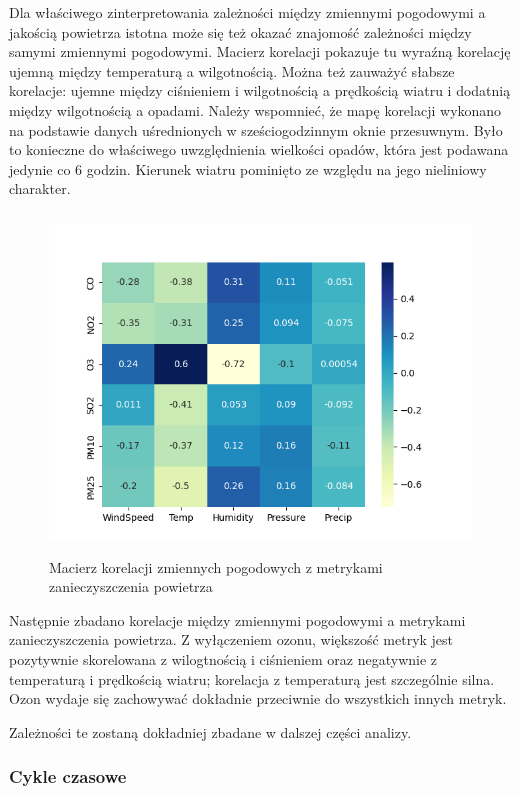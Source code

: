 \documentclass[18pt, letterpaper]{article}
\begin{document}
Dla właściwego zinterpretowania zależności między zmiennymi pogodowymi a jakością powietrza istotna może się też okazać znajomość zależności między samymi zmiennymi pogodowymi. Macierz korelacji pokazuje tu wyraźną korelację ujemną między temperaturą a wilgotnością. Można też zauważyć słabsze korelacje: ujemne między ciśnieniem i wilgotnością a prędkością wiatru i dodatnią między wilgotnością a opadami. Należy wspomnieć, że mapę korelacji wykonano na podstawie danych uśrednionych w sześciogodzinnym oknie przesuwnym. Było to konieczne do właściwego uwzględnienia wielkości opadów, która jest podawana jedynie co 6 godzin. Kierunek wiatru pominięto ze względu na jego nieliniowy charakter.

\begin{figure}[H]
\centering
\includegraphics[width=120mm, height=90mm]{visualisations/corr_heatmaps/pollutionxweather_corr_heatmap.png}
\caption{Macierz korelacji zmiennych pogodowych z metrykami zanieczyszczenia powietrza}
\end{figure}

Następnie zbadano korelacje między zmiennymi pogodowymi a metrykami zanieczyszczenia powietrza. Z wyłączeniem ozonu, większość metryk jest pozytywnie skorelowana z wilogtnością i ciśnieniem oraz negatywnie z temperaturą i prędkością wiatru; korelacja z temperaturą jest szczególnie silna. Ozon wydaje się zachowywać dokładnie przeciwnie do wszystkich innych metryk.

Zależności te zostaną dokładniej zbadane w dalszej części analizy.

\subsubsection{Cykle czasowe}
\end{document}
